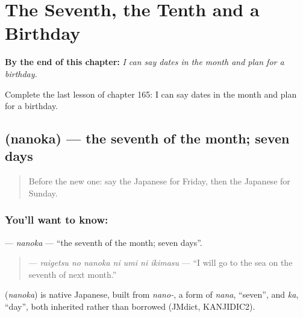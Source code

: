 
\chapter{The Seventh, the Tenth and a Birthday}
\label{ch:ja-the-seventh-the-tenth-and-a-birthday}

\begin{chapteropening}
\textbf{By the end of this chapter:} \emph{I can say dates in the month and plan for a birthday.}

Complete the last lesson of chapter 165: I can say dates in the month and plan for a birthday.
\end{chapteropening}

\section[\texorpdfstring{\ja{なのか} (nanoka)}{なのか (nanoka)}]{ (nanoka) — the seventh of the month; seven days}

\label{lesson:JA-C165-nanoka}



\begin{quote}
Before the new one: say the Japanese for Friday, then the Japanese for Sunday.
\end{quote}

\subsection*{You'll want to know: }
\textbf{} — \emph{nanoka} — \textquotedblleft{}the seventh of the month; seven days\textquotedblright{}.

\begin{quote}
\textbf{   } — \emph{raigetsu no nanoka ni umi ni ikimasu} — \textquotedblleft{}I will go to the sea on the seventh of next month.\textquotedblright{}
\end{quote}

\begin{cousinweb}
\textbf{} (\emph{nanoka}) is native Japanese, built from \emph{nano-}, a form of \emph{nana}, \textquotedblleft{}seven\textquotedblright{}, and \emph{ka}, \textquotedblleft{}day\textquotedblright{}, both inherited rather than borrowed (JMdict, KANJIDIC2).
\end{cousinweb}

